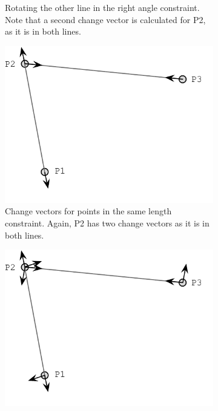 \begin{figure}
\begin{subfigure}[t]{51mm}
    \caption{Rotating the other line in the right angle
      constraint. Note that a second change vector is calculated for
      P2, as it is in both lines.}
    \label{fig:solving-angle-2}
  \end{subfigure}
  \hspace{1mm} %
  \begin{subfigure}[t]{51mm}
    \includegraphics[width=\linewidth]{img/solving-distance.pdf}
    \caption{Change vectors for points in the same length
      constraint. Again, P2 has two change vectors as it is in both
      lines.}
    \label{fig:solving-distance}
  \end{subfigure}
  \hspace{1mm} %
  \begin{subfigure}[t]{51mm}
    \includegraphics[width=\linewidth]{img/solving-accum-1.pdf}

\end{subfigure}
\end{figure}
